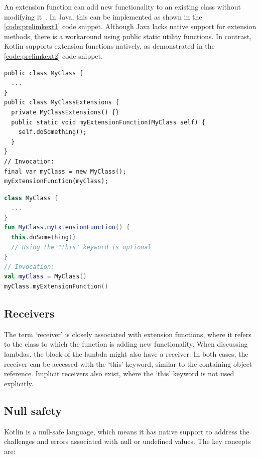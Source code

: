 An extension function can add new functionality to an existing class without modifying it~\cite{KExt}. In Java, this can be implemented as shown in the \ref{code:prelimkext1} code snippet. Although Java lacks native support for extension methods, there is a workaround using public static utility functions. In contrast, Kotlin supports extension functions natively, as demonstrated in the \ref{code:prelimkext2} code snippet.

\begin{lstlisting}[caption={Extension functions in Java},language=Java11,label=code:prelimkext1]
public class MyClass {
  ...
}
public class MyClassExtensions {
  private MyClassExtensions() {}
  public static void myExtensionFunction(MyClass self) {
    self.doSomething();
  }
}
// Invocation:
final var myClass = new MyClass();
myExtensionFunction(myClass);
\end{lstlisting}

\begin{lstlisting}[caption={Extension functions in Kotlin},language=Kotlin,label=code:prelimkext2]
class MyClass {
  ...
}
fun MyClass.myExtensionFunction() {
  this.doSomething()
  // Using the "this" keyword is optional
}
// Invocation:
val myClass = MyClass()
myClass.myExtensionFunction()
\end{lstlisting}

\subsection{Receivers}

The term `receiver' is closely associated with extension functions, where it refers to the class to which the function is adding new functionality. When discussing lambdas, the block of the lambda might also have a receiver. In both cases, the receiver can be accessed with the `this' keyword, similar to the containing object reference. Implicit receivers also exist, where the `this' keyword is not used explicitly.

\subsection{Null safety}

Kotlin is a null-safe language, which means it has native support to address the challenges and errors associated with null or undefined values. The key concepts are:


